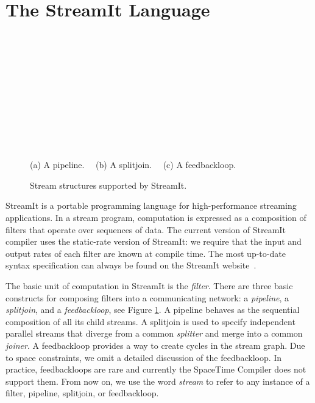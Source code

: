 \section{The StreamIt Language}
\label{sec:streamit}
\begin{figure}[t]
\begin{minipage}{3.2in}
\begin{center}
\begin{minipage}{0.46in}
\centering
{} \\
\end{minipage} 
~
\begin{minipage}{1.3in}
\centering
{} \\
\end{minipage}
~
\begin{minipage}{1.02in}
\centering
{} \\
\end{minipage} 
\\ ~ \\ {\protect\small (a) A pipeline. ~~(b) A splitjoin. ~~(c) A feedbackloop.}
\caption{Stream structures supported by StreamIt.
\protect\label{fig:structures}}
\end{center}
\end{minipage}
\end{figure}

StreamIt is a portable programming language for high-performance
streaming applications.  In a stream program, computation is expressed
as a composition of filters that operate over sequences of data. The
current version of StreamIt compiler uses the static-rate version of
StreamIt: we require that the input and output rates of each filter
are known at compile time.  The most up-to-date syntax specification
can always be found on the StreamIt website~\cite{streamitweb}.

The basic unit of computation in StreamIt is the {\it filter}.  There
are three basic constructs for composing filters into a communicating
network: a {\it pipeline}, a {\it splitjoin}, and a {\it
feedbackloop}, see Figure \ref{fig:structures}.  A pipeline behaves as
the sequential composition of all its child streams.  A splitjoin is
used to specify independent parallel streams that diverge from a
common {\it splitter} and merge into a common {\it joiner}. A
feedbackloop provides a way to create cycles in the stream graph.  Due
to space constraints, we omit a detailed discussion of the
feedbackloop. In practice, feedbackloops are rare and currently the
SpaceTime Compiler does not support them. From now on, we use the word
{\it stream} to refer to any instance of a filter, pipeline,
splitjoin, or feedbackloop.


